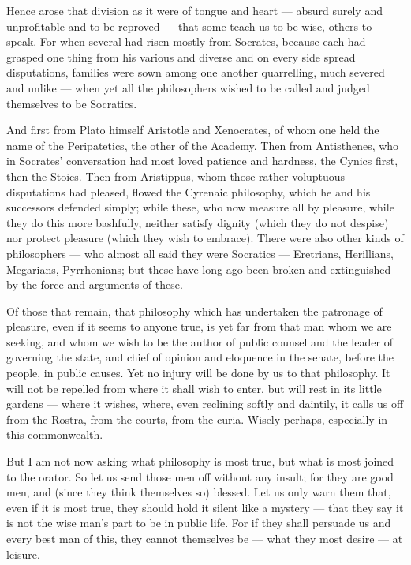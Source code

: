  Hence arose that division as it were of tongue and heart — absurd surely and unprofitable and to be reproved — that some teach us to be wise, others to speak. For when several had risen mostly from Socrates, because each had grasped one thing from his various and diverse and on every side spread disputations, families were sown among one another quarrelling, much severed and unlike — when yet all the philosophers wished to be called and judged themselves to be Socratics.

 And first from Plato himself Aristotle and Xenocrates, of whom one held the name of the Peripatetics, the other of the Academy. Then from Antisthenes, who in Socrates' conversation had most loved patience and hardness, the Cynics first, then the Stoics. Then from Aristippus, whom those rather voluptuous disputations had pleased, flowed the Cyrenaic philosophy, which he and his successors defended simply; while these, who now measure all by pleasure, while they do this more bashfully, neither satisfy dignity (which they do not despise) nor protect pleasure (which they wish to embrace). There were also other kinds of philosophers — who almost all said they were Socratics — Eretrians, Herillians, Megarians, Pyrrhonians; but these have long ago been broken and extinguished by the force and arguments of these.

 Of those that remain, that philosophy which has undertaken the patronage of pleasure, even if it seems to anyone true, is yet far from that man whom we are seeking, and whom we wish to be the author of public counsel and the leader of governing the state, and chief of opinion and eloquence in the senate, before the people, in public causes. Yet no injury will be done by us to that philosophy. It will not be repelled from where it shall wish to enter, but will rest in its little gardens — where it wishes, where, even reclining softly and daintily, it calls us off from the Rostra, from the courts, from the curia. Wisely perhaps, especially in this commonwealth.

 But I am not now asking what philosophy is most true, but what is most joined to the orator. So let us send those men off without any insult; for they are good men, and (since they think themselves so) blessed. Let us only warn them that, even if it is most true, they should hold it silent like a mystery — that they say it is not the wise man's part to be in public life. For if they shall persuade us and every best man of this, they cannot themselves be — what they most desire — at leisure.

